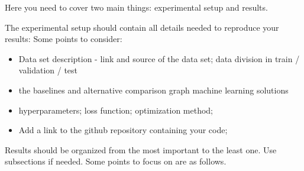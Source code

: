 \documentclass{article}
\begin{document}
Here you need to cover two main things: experimental setup and results.

The experimental setup should contain all details needed to reproduce your results: Some points to consider:
\begin{itemize}
\item Data set description - link and source of the data set; data division in train / validation / test
\item the baselines and alternative comparison graph machine learning solutions
\item hyperparameters; loss function; optimization method;
\item Add a link to the github repository containing your code;
\end{itemize}

Results should be organized from the most important to the least one. Use subsections if needed. Some points to focus on are as follows.
\end{document}

